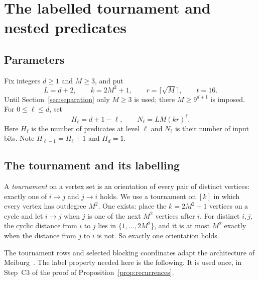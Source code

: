 \documentclass[11pt]{article}
\theoremstyle{definition}
\theoremstyle{remark}
\begin{document}
\section{The labelled tournament and nested predicates}
\label{sec:construction}

\subsection{Parameters}

Fix integers \(d\ge1\) and \(M\ge3\), and put
\[
 L=d+2,\qquad k=2M^2+1,\qquad r=\lceil\sqrt M\rceil,
 \qquad t=16.
\]
Until Section~\ref{sec:separation} only \(M\ge3\) is used; there \(M\ge9^{d+1}\) is imposed.
For \(0\le\ell\le d\), set
\[
 H_\ell=d+1-\ell,\qquad N_\ell=LM(kr)^\ell.
\]
Here \(H_\ell\) is the number of predicates at level \(\ell\) and \(N_\ell\) is their number of input bits.
Note \(H_{\ell-1}=H_\ell+1\) and \(H_d=1\).

\subsection{The tournament and its labelling}

A \emph{tournament} on a vertex set is an orientation of every pair of distinct vertices: exactly one of \(i\to j\) and \(j\to i\) holds.
We use a tournament on \([k]\) in which every vertex has outdegree \(M^2\).
One exists: place the \(k=2M^2+1\) vertices on a cycle and let \(i\to j\) when \(j\) is one of the next \(M^2\) vertices after \(i\).
For distinct \(i,j\), the cyclic distance from \(i\) to \(j\) lies in \(\{1,\ldots,2M^2\}\), and it is at most \(M^2\) exactly when the distance from \(j\) to \(i\) is not.
So exactly one orientation holds.

The tournament rows and selected blocking coordinates adapt the architecture
of Meiburg~\cite[Sections~3.1 and~5.2--5.5]{Meiburg2026}.
The label property needed here is the following.
It is used once, in Step~C3 of the proof of Proposition~\ref{prop:recurrences}.
\end{document}
